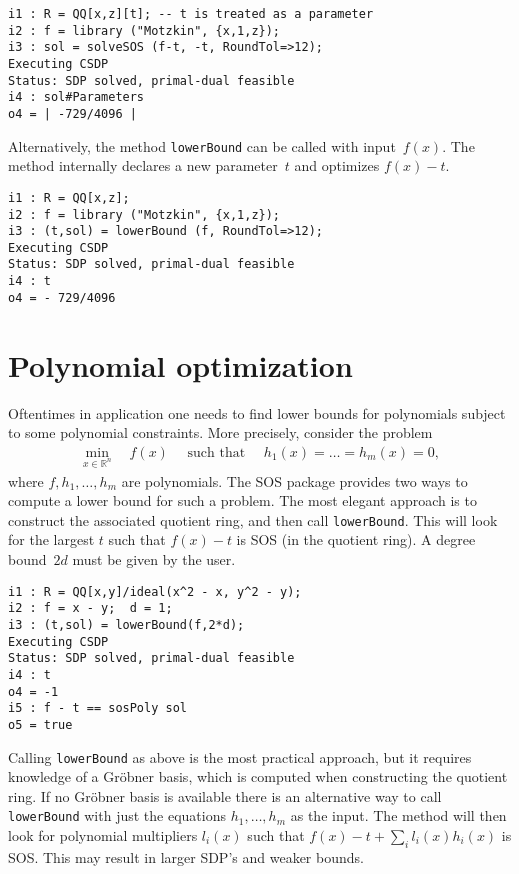 \documentclass[11pt]{amsart}
\theoremstyle{plain}%
\theoremstyle{definition}
\theoremstyle{remark}
\newcommand{\SOS}{\textsc{SOS}\xspace}
\newcommand{\RR}{\mathbb{R}}
\begin{document}
{\small
\begin{verbatim}
i1 : R = QQ[x,z][t]; -- t is treated as a parameter
i2 : f = library ("Motzkin", {x,1,z});
i3 : sol = solveSOS (f-t, -t, RoundTol=>12);
Executing CSDP
Status: SDP solved, primal-dual feasible
i4 : sol#Parameters
o4 = | -729/4096 |
\end{verbatim}
}

\noindent
Alternatively, the method \verb|lowerBound| can be called with input~$f(x)$.
The method internally declares a new parameter~$t$ and optimizes $f(x)-t$.
{\small
\begin{verbatim}
i1 : R = QQ[x,z];
i2 : f = library ("Motzkin", {x,1,z});
i3 : (t,sol) = lowerBound (f, RoundTol=>12);
Executing CSDP
Status: SDP solved, primal-dual feasible
i4 : t
o4 = - 729/4096
\end{verbatim}
}

\section{Polynomial optimization}

Oftentimes in application one needs to find lower bounds for polynomials subject to some polynomial constraints.
More precisely, consider the problem
\begin{align*}
  \min_{x\in \RR^n} \quad f(x)
  \quad \text{ such that }\quad
  h_1(x)=\dots=h_m(x)=0,
\end{align*}
where $f, h_1,\dots,h_m$ are polynomials.
The \SOS package provides two ways to compute a lower bound for such a problem.
The most elegant approach is to construct the associated quotient ring, and then call \verb|lowerBound|.
This will look for the largest $t$ such that $f(x)-t$ is SOS (in the quotient ring).
A degree bound~$2d$ must be given by the user.

{\small
\begin{verbatim}
i1 : R = QQ[x,y]/ideal(x^2 - x, y^2 - y);
i2 : f = x - y;  d = 1;
i3 : (t,sol) = lowerBound(f,2*d);
Executing CSDP
Status: SDP solved, primal-dual feasible
i4 : t
o4 = -1
i5 : f - t == sosPoly sol
o5 = true
\end{verbatim}
}

Calling \verb|lowerBound| as above is the most practical approach, but it requires knowledge of a Gröbner basis, which is computed when constructing the quotient ring.
If no Gröbner basis is available there is an alternative way to call \verb|lowerBound| with just the equations $h_1,\dots,h_m$ as the input.
The method will then look for polynomial multipliers $l_i(x)$ such that $f(x) - t + \sum_i l_i(x)h_i(x)$ is SOS.
This may result in larger SDP's and weaker bounds.
\end{document}
